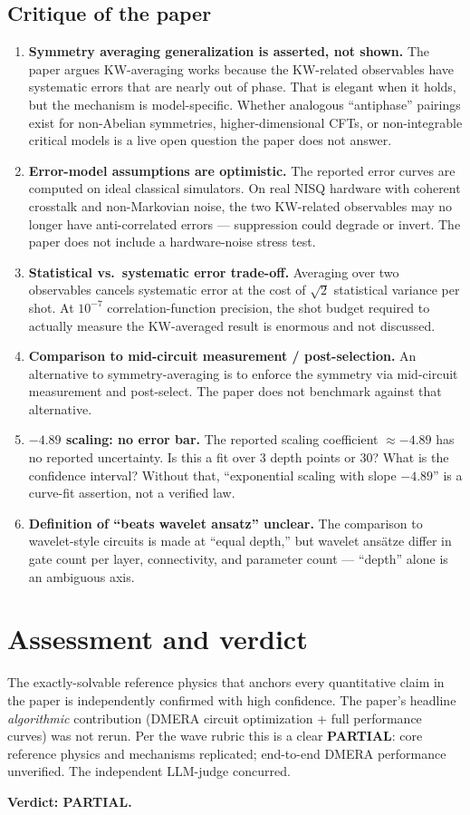 \documentclass[11pt]{article}
\begin{document}
\subsection*{Critique of the paper}
\begin{enumerate}
  \item \textbf{Symmetry averaging generalization is asserted, not shown.} The paper
    argues KW-averaging works because the KW-related observables have systematic
    errors that are nearly out of phase. That is elegant when it holds, but the
    mechanism is model-specific. Whether analogous ``antiphase'' pairings exist for
    non-Abelian symmetries, higher-dimensional CFTs, or non-integrable critical
    models is a live open question the paper does not answer.
  \item \textbf{Error-model assumptions are optimistic.} The reported error curves
    are computed on ideal classical simulators. On real NISQ hardware with coherent
    crosstalk and non-Markovian noise, the two KW-related observables may no longer
    have anti-correlated errors --- suppression could degrade or invert. The paper
    does not include a hardware-noise stress test.
  \item \textbf{Statistical vs.\ systematic error trade-off.} Averaging over two
    observables cancels systematic error at the cost of $\sqrt{2}$ statistical
    variance per shot. At $10^{-7}$ correlation-function precision, the shot budget
    required to actually measure the KW-averaged result is enormous and not
    discussed.
  \item \textbf{Comparison to mid-circuit measurement / post-selection.} An
    alternative to symmetry-averaging is to enforce the symmetry via mid-circuit
    measurement and post-select. The paper does not benchmark against that
    alternative.
  \item \textbf{$-4.89$ scaling: no error bar.} The reported scaling coefficient
    $\approx -4.89$ has no reported uncertainty. Is this a fit over 3 depth points or
    30? What is the confidence interval? Without that, ``exponential scaling with
    slope $-4.89$'' is a curve-fit assertion, not a verified law.
  \item \textbf{Definition of ``beats wavelet ansatz'' unclear.} The comparison to
    wavelet-style circuits is made at ``equal depth,'' but wavelet ansätze differ in
    gate count per layer, connectivity, and parameter count --- ``depth'' alone is an
    ambiguous axis.
\end{enumerate}

\section{Assessment and verdict}
The exactly-solvable reference physics that anchors every quantitative claim in the
paper is independently confirmed with high confidence. The paper's headline
\emph{algorithmic} contribution (DMERA circuit optimization + full performance
curves) was not rerun. Per the wave rubric this is a clear \textbf{PARTIAL}: core
reference physics and mechanisms replicated; end-to-end DMERA performance unverified.
The independent LLM-judge concurred.

\medskip
\noindent \textbf{Verdict: PARTIAL.}
\end{document}
